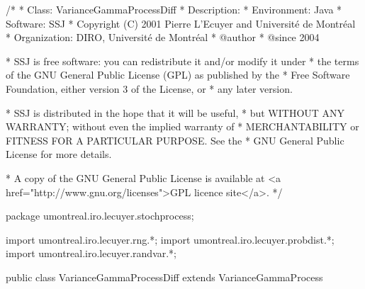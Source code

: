 \begin{code}
\begin{hide}
/*
 * Class:        VarianceGammaProcessDiff
 * Description:  
 * Environment:  Java
 * Software:     SSJ 
 * Copyright (C) 2001  Pierre L'Ecuyer and Université de Montréal
 * Organization: DIRO, Université de Montréal
 * @author       
 * @since        2004

 * SSJ is free software: you can redistribute it and/or modify it under
 * the terms of the GNU General Public License (GPL) as published by the
 * Free Software Foundation, either version 3 of the License, or
 * any later version.

 * SSJ is distributed in the hope that it will be useful,
 * but WITHOUT ANY WARRANTY; without even the implied warranty of
 * MERCHANTABILITY or FITNESS FOR A PARTICULAR PURPOSE.  See the
 * GNU General Public License for more details.

 * A copy of the GNU General Public License is available at
   <a href="http://www.gnu.org/licenses">GPL licence site</a>.
 */
\end{hide}
package umontreal.iro.lecuyer.stochprocess;\begin{hide}
import umontreal.iro.lecuyer.rng.*;
import umontreal.iro.lecuyer.probdist.*;
import umontreal.iro.lecuyer.randvar.*;

\end{hide}

public class VarianceGammaProcessDiff extends VarianceGammaProcess \begin{hide} {
    protected GammaProcess gpos;
    protected GammaProcess gneg;
    protected double       mup, mun,
                           nup, nun;
\end{hide}
\end{code}
